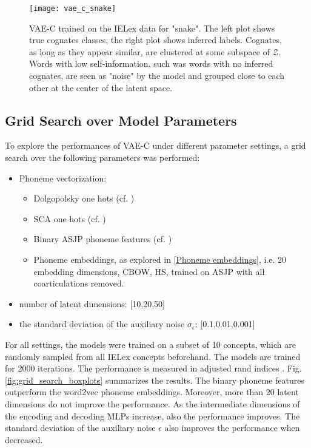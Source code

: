 \documentclass[6pt]{article}
\begin{document}
\begin{figure}[h!] %
   \centering
   \texttt{[image: vae\_c\_snake]} 
   \caption{VAE-C trained on the IELex data for "snake". The left plot shows true cognates classes, the right plot shows inferred labels. Cognates, as long as they appear similar, are clustered at some subspace of $\mathcal{Z}$. Words with low self-information, such was words with no inferred cognates, are seen as "noise" by the model and grouped close to each other at the center of the latent space.}
   \label{fig:vae_c_snake}
\end{figure}
\subsection{Grid Search over Model Parameters}

To explore the performances of VAE-C under different parameter settings, a grid search over the following parameters was performed:
\begin{itemize}
\item Phoneme vectorization:  \begin{itemize}
\item Dolgopolsky one hots (cf. \cite{dolgopolsky1986probabilistic,list2012sca})
\item SCA one hots (cf. \cite{list2012sca})
\item Binary ASJP phoneme features (cf. \cite{rama2016siamese}) 
\item Phoneme embeddings, as explored in \ref{Phoneme embeddings}, i.e. 20 embedding dimensions, CBOW, HS, trained on ASJP with all coarticulations removed. 
\end{itemize}
\item number of latent dimensions:  [10,20,50]
\item the standard deviation of the auxiliary noise $\sigma_{\epsilon}$: [0.1,0.01,0.001]
\end{itemize}
For all settings, the models were trained on a subset of 10 concepts, which are randomly sampled from all IELex concepts beforehand. The models are trained for 2000 iterations. 
The performance is measured in adjusted rand indices \citep{rand1971objective,hubert1985comparing}. 
Fig. \ref{fig:grid_search_boxplots} summarizes the results. The binary phoneme features outperform the word2vec phoneme embeddings. Moreover, more than 20 latent dimensions do not improve the performance. As the intermediate dimensions of the encoding and decoding MLPs increase, also the performance improves. The standard deviation of the auxiliary noise $\epsilon$ also improves the performance when decreased.
\end{document}
